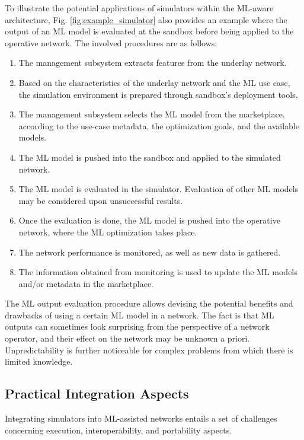 \documentclass[journal]{IEEEtran}
\begin{document}
	To illustrate the potential applications of simulators within the ML-aware architecture, Fig. \ref{fig:example_simulator} also provides an example where the output of an ML model is evaluated at the sandbox before being applied to the operative network. The involved procedures are as follows:
	\begin{enumerate}
		\item The management subsystem extracts features from the underlay network.
		\item Based on the characteristics of the underlay network and the ML use case, the simulation environment is prepared through sandbox's deployment tools.
		\item The management subsystem selects the ML model from the marketplace, according to the use-case metadata, the optimization goals, and the available models.
		\item The ML model is pushed into the sandbox and applied to the simulated network.
		\item The ML model is evaluated in the simulator. Evaluation of other ML models may be considered upon unsuccessful results.
		\item Once the evaluation is done, the ML model is pushed into the operative network, where the ML optimization takes place. 
		\item The network performance is monitored, as well as new data is gathered.
		\item The information obtained from monitoring is used to update the ML models and/or metadata in the marketplace.  
	\end{enumerate}
	
	The ML output evaluation procedure allows devising the potential benefits and drawbacks of using a certain ML model in a network. The fact is that ML outputs can sometimes look surprising from the perspective of a network operator, and their effect on the network may be unknown a priori. Unpredictability is further noticeable for complex problems from which there is limited knowledge.
	
	\subsection{Practical Integration Aspects}
	
	Integrating simulators into ML-assisted networks entails a set of challenges concerning execution, interoperability, and portability aspects.
	
\end{document}
